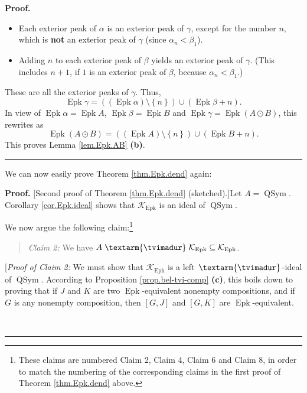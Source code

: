 \documentclass[numbers=enddot,12pt,final,onecolumn,notitlepage]{scrartcl}%
\theoremstyle{definition}
\newenvironment{statement}{\begin{quote}}{\end{quote}}
\newenvironment{proof}[1][Proof]{\noindent\textbf{#1.} }{\ \rule{0.5em}{0.5em}}
\newenvironment{verlong}{}{}
\newcommand{\tvi}{\left. \textarm{\tvimadur} \right.}
\begin{document}
\begin{verlong}
\begin{proof}
\begin{itemize}
\item Each exterior peak of $\alpha$ is an exterior peak of $\gamma$, except
for the number $n$, which is \textbf{not} an exterior peak of $\gamma$ (since
$\alpha_{n}<\beta_{1}$).

\item Adding $n$ to each exterior peak of $\beta$ yields an exterior peak of
$\gamma$. (This includes $n+1$, if $1$ is an exterior peak of $\beta$, because
$\alpha_{n}<\beta_{1}$.)
\end{itemize}

These are all the exterior peaks of $\gamma$. Thus,%
\[
\operatorname*{Epk}\gamma=\left(  \left(  \operatorname*{Epk}\alpha\right)
\setminus\left\{  n\right\}  \right)  \cup\left(  \operatorname*{Epk}%
\beta+n\right)  .
\]
In view of $\operatorname*{Epk}\alpha=\operatorname*{Epk}A$,
$\operatorname*{Epk}\beta=\operatorname*{Epk}B$ and $\operatorname*{Epk}%
\gamma=\operatorname*{Epk}\left(  A\odot B\right)  $, this rewrites as
\[
\operatorname*{Epk}\left(  A\odot B\right)  =\left(  \left(
\operatorname*{Epk}A\right)  \setminus\left\{  n\right\}  \right)  \cup\left(
\operatorname*{Epk}B+n\right)  .
\]
This proves Lemma \ref{lem.Epk.AB} \textbf{(b)}.
\end{proof}

We can now easily prove Theorem \ref{thm.Epk.dend} again:

\begin{proof}
[Second proof of Theorem \ref{thm.Epk.dend} (sketched).]Let
$A=\operatorname*{QSym}$. Corollary \ref{cor.Epk.ideal} shows that
$\mathcal{K}_{\operatorname*{Epk}}$ is an ideal of $\operatorname*{QSym}$.

We now argue the following claim:\footnote{These claims are numbered Claim 2,
Claim 4, Claim 6 and Claim 8, in order to match the numbering of the
corresponding claims in the first proof of Theorem \ref{thm.Epk.dend} above.}

\begin{statement}
\textit{Claim 2:} We have $A\tvi\mathcal{K}_{\operatorname*{Epk}}%
\subseteq\mathcal{K}_{\operatorname*{Epk}}$.
\end{statement}

[\textit{Proof of Claim 2:} We must show that $\mathcal{K}%
_{\operatorname*{Epk}}$ is a left $\tvi$-ideal of $\operatorname*{QSym}$.
According to Proposition \ref{prop.bel-tvi-comp} \textbf{(c)}, this boils down
to proving that if $J$ and $K$ are two $\operatorname*{Epk}$-equivalent
nonempty compositions, and if $G$ is any nonempty composition, then $\left[
G,J\right]  $ and $\left[  G,K\right]  $ are $\operatorname*{Epk}$-equivalent.


\end{proof}
\end{verlong}
\end{document}
